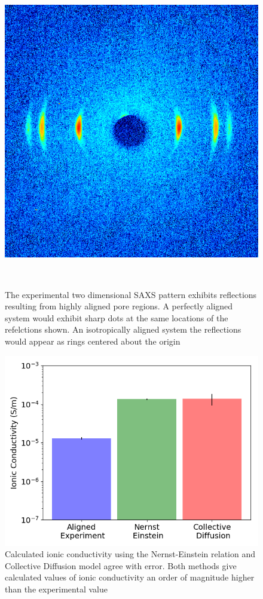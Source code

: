 \documentclass{article}
\begin{document}
  \begin{figure}
  \centering
  \includegraphics[width=0.5\linewidth]{2D-SAXS_cropped.png}
  \caption{The experimental two dimensional SAXS pattern exhibits reflections
  resulting from highly aligned pore regions. A perfectly aligned system 
  would exhibit sharp dots at the same locations of the refelctions shown. 
  An isotropically aligned system the reflections would appear as 
  rings centered about the origin}~\label{fig:2DSAXS}
  \end{figure}

\begin{figure}
        \centering
        \includegraphics[width=0.5\linewidth]{IC_offset.png}
        \caption{Calculated ionic conductivity using the Nernst-Einstein relation
        and Collective Diffusion model agree with error. Both methods give calculated
        values of ionic conductivity an order of magnitude higher than the experimental
        value}
        \label{fig:conductivity}
\end{figure}
\end{document}
